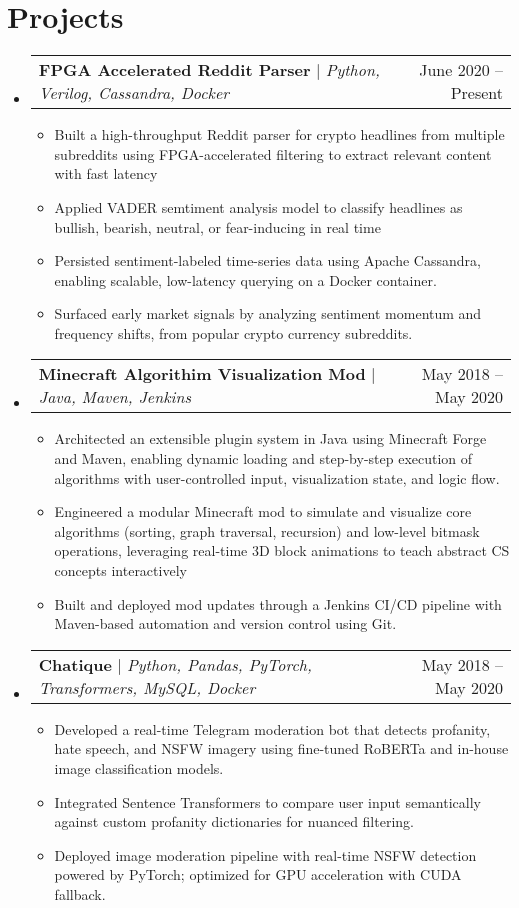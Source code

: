 \documentclass[letterpaper,11pt]{article}
\makeatletter
\newcommand{\resumeItem}[1]{
  \item\small{
    {#1 \vspace{-2pt}}
  }
}
\newcommand{\resumeSubSubheading}[2]{
    \item
    \begin{tabular*}{0.97\textwidth}{l@{\extracolsep{\fill}}r}
      \textit{\small#1} & \textit{\small #2} \\
    \end{tabular*}\vspace{-7pt}
}
\newcommand{\resumeProjectHeading}[2]{
    \item
    \begin{tabular*}{0.97\textwidth}{l@{\extracolsep{\fill}}r}
      \small#1 & #2 \\
    \end{tabular*}\vspace{-7pt}
}
\newcommand{\resumeSubHeadingListStart}{\begin{itemize}[leftmargin=0.15in, label={}]}
\newcommand{\resumeSubHeadingListEnd}{\end{itemize}}
\newcommand{\resumeItemListStart}{\begin{itemize}}
\newcommand{\resumeItemListEnd}{\end{itemize}\vspace{-5pt}}
\makeatother
\begin{document}

\section{Projects}
    \resumeSubHeadingListStart
\resumeProjectHeading
  {\textbf{FPGA Accelerated Reddit Parser} $|$ \emph{Python, Verilog, Cassandra, Docker}}{June 2020 -- Present}
  \resumeItemListStart
    \resumeItem{Built a high-throughput Reddit parser for crypto headlines from multiple subreddits using FPGA-accelerated filtering to extract relevant content with fast latency}
    \resumeItem{Applied VADER semtiment analysis model to classify headlines as bullish, bearish, neutral, or fear-inducing in real time}
    \resumeItem{Persisted sentiment-labeled time-series data using Apache Cassandra, enabling scalable, low-latency querying on a Docker container.}
    \resumeItem{Surfaced early market signals by analyzing sentiment momentum and frequency shifts, from popular crypto currency subreddits.}
  \resumeItemListEnd
  \resumeProjectHeading
  {\textbf{Minecraft Algorithim Visualization Mod} $|$ \emph{Java, Maven, Jenkins}}{May 2018 -- May 2020}
  \resumeItemListStart
    \resumeItem{Architected an extensible plugin system in Java using Minecraft Forge and Maven, enabling dynamic loading and step-by-step execution of algorithms with user-controlled input, visualization state, and logic flow.}
    \resumeItem{Engineered a modular Minecraft mod to simulate and visualize core algorithms (sorting, graph traversal, recursion) and low-level bitmask operations, leveraging real-time 3D block animations to teach abstract CS concepts interactively}
    \resumeItem{Built and deployed mod updates through a Jenkins CI/CD pipeline with Maven-based automation and version control using Git.}
  \resumeItemListEnd
    \resumeProjectHeading
          {\textbf{Chatique} $|$ \emph{Python, Pandas, PyTorch, Transformers, MySQL, Docker}}{May 2018 -- May 2020}
          \resumeItemListStart
            \resumeItem{Developed a real-time Telegram moderation bot that detects profanity, hate speech, and NSFW imagery using fine-tuned RoBERTa and in-house image classification models.}
            \resumeItem{Integrated Sentence Transformers to compare user input semantically against custom profanity dictionaries for nuanced filtering.}
            \resumeItem{Deployed image moderation pipeline with real-time NSFW detection powered by PyTorch; optimized for GPU acceleration with CUDA fallback.}
          \resumeItemListEnd
    \resumeSubHeadingListEnd
\end{document}
